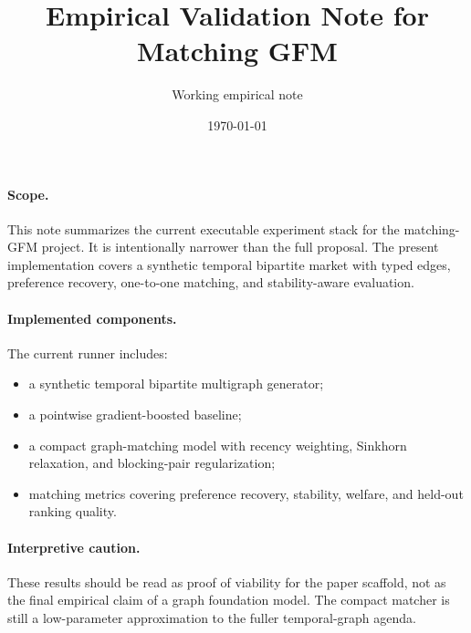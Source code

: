 \documentclass[11pt]{article}
\title{Empirical Validation Note for Matching GFM}
\author{Working empirical note}
\date{\today}
\begin{document}
\maketitle

\paragraph{Scope.}
This note summarizes the current executable experiment stack for the
matching-GFM project. It is intentionally narrower than the full proposal.
The present implementation covers a synthetic temporal bipartite market with
typed edges, preference recovery, one-to-one matching, and stability-aware
evaluation.

\paragraph{Implemented components.}
The current runner includes:
\begin{itemize}
  \item a synthetic temporal bipartite multigraph generator;
  \item a pointwise gradient-boosted baseline;
  \item a compact graph-matching model with recency weighting, Sinkhorn
  relaxation, and blocking-pair regularization;
  \item matching metrics covering preference recovery, stability, welfare, and
  held-out ranking quality.
\end{itemize}


\paragraph{Interpretive caution.}
These results should be read as proof of viability for the paper scaffold, not
as the final empirical claim of a graph foundation model. The compact matcher is
still a low-parameter approximation to the fuller temporal-graph agenda.
\end{document}
